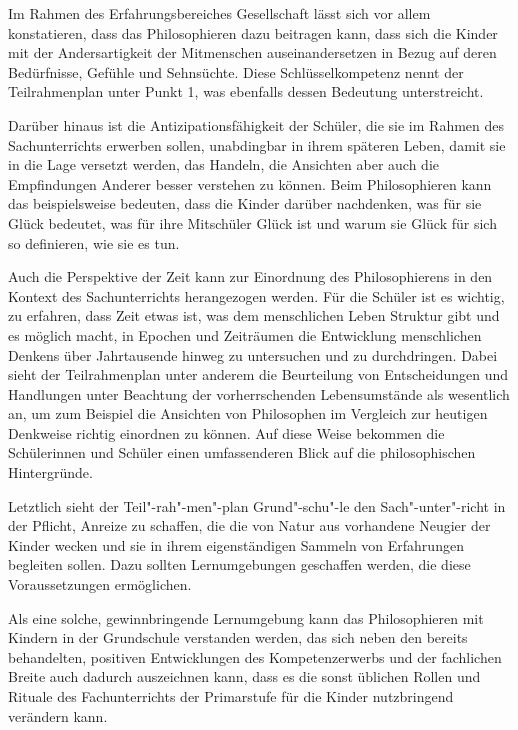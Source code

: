 Im Rahmen des Erfahrungsbereiches \glqq Gesellschaft\grqq{} lässt sich vor allem konstatieren, dass das Philosophieren dazu beitragen kann, dass sich die Kinder mit der Andersartigkeit der Mitmenschen auseinandersetzen in Bezug auf deren Bedürfnisse, Gefühle und Sehnsüchte. 
Diese Schlüsselkompetenz nennt der Teilrahmenplan unter Punkt 1, was ebenfalls dessen Bedeutung unterstreicht. 

Darüber hinaus ist die Antizipationsfähigkeit der Schüler, die sie im Rahmen des Sachunterrichts erwerben sollen, unabdingbar in ihrem späteren Leben, damit sie in die Lage versetzt werden, das Handeln, die Ansichten aber auch die Empfindungen Anderer besser verstehen zu können. 
Beim Philosophieren kann das beispielsweise bedeuten, dass die Kinder darüber nachdenken, was für sie Glück bedeutet, was für ihre Mitschüler Glück ist und warum sie Glück für sich so definieren, wie sie es tun. 

Auch die Perspektive der Zeit kann zur Einordnung des Philosophierens in den Kontext des Sachunterrichts herangezogen werden. 
Für die Schüler ist es wichtig, zu erfahren, dass Zeit etwas ist, was dem menschlichen Leben Struktur gibt und es möglich macht, in Epochen und Zeiträumen die Entwicklung menschlichen Denkens über Jahrtausende hinweg zu untersuchen und zu durchdringen. 
Dabei sieht der Teilrahmenplan unter anderem die \glqq Beurteilung von Entscheidungen und Handlungen\grqq{} \cite[S.\,15]{MBFJ06} unter Beachtung der vorherrschenden Lebensumstände als wesentlich an, um zum Beispiel die Ansichten von Philosophen im Vergleich zur heutigen Denkweise richtig einordnen zu können. 
Auf diese Weise bekommen die Schülerinnen und Schüler einen umfassenderen Blick auf die philosophischen Hintergründe.

Letztlich sieht der Teil"-rah"-men"-plan Grund"-schu"-le den Sach"-unter"-richt in der Pflicht, 
Anreize zu schaffen, die die von Natur aus vorhandene Neugier der Kinder wecken und sie in ihrem eigenständigen Sammeln von Erfahrungen begleiten sollen. 
Dazu sollten Lernumgebungen geschaffen werden, die diese Voraussetzungen ermöglichen. 

Als eine solche, gewinnbringende Lernumgebung kann das Philosophieren mit Kindern in der Grundschule verstanden werden, das sich neben den bereits behandelten, positiven Entwicklungen des Kompetenzerwerbs und der fachlichen Breite
auch dadurch auszeichnen kann, dass es die sonst üblichen Rollen und Rituale des Fachunterrichts der Primarstufe für die Kinder nutzbringend verändern kann.

